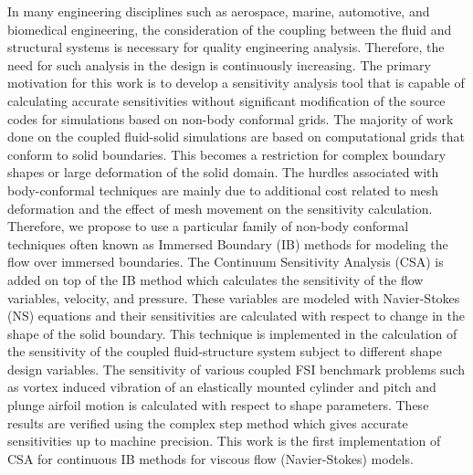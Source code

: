 In many engineering disciplines such as aerospace, marine, automotive, and biomedical engineering, the consideration of the coupling between the fluid and structural systems is necessary for quality engineering analysis. Therefore, the need for such analysis in the design is continuously increasing. The primary motivation for this work is to develop a sensitivity analysis tool that is capable of calculating accurate sensitivities without significant modification of the source codes for simulations based on non-body conformal grids. The majority of work done on the coupled fluid-solid simulations are based on computational grids that conform to solid boundaries. This becomes a restriction for complex boundary shapes or large deformation of the solid domain. The hurdles associated with body-conformal techniques are mainly due to additional cost related to mesh deformation and the effect of mesh movement on the sensitivity calculation. Therefore, we propose to use a particular family of non-body conformal techniques often known as Immersed Boundary (IB) methods for modeling the flow over immersed boundaries. The Continuum Sensitivity Analysis (CSA) is added on top of the IB method which calculates the sensitivity of the flow variables, velocity, and pressure. These variables are modeled with Navier-Stokes (NS) equations and their sensitivities are calculated with respect to change in the shape of the solid boundary. This technique is implemented in the calculation of the sensitivity of the coupled fluid-structure system subject to different shape design variables. The sensitivity of various coupled FSI benchmark problems such as vortex induced vibration of an elastically mounted cylinder and pitch and plunge airfoil motion is calculated with respect to shape parameters.  These results are verified using the complex step method which gives accurate sensitivities up to machine precision. This work is the first implementation of CSA for continuous IB methods for viscous flow (Navier-Stokes) models.
